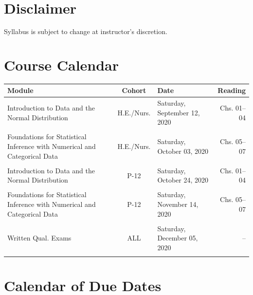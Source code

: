 \documentclass[
]{article}
\begin{document}
\section{Disclaimer}

Syllabus is subject to change at instructor's discretion.

\newpage

\section{Course Calendar}

\begin{tabularx}{\linewidth}{XcXr}
\hline
\textbf{Module} & \textbf{Cohort} & \textbf{Date} & \textbf{Reading} \\
\hline

Introduction to Data and the Normal Distribution & H.E./Nurs. & Saturday, September 12, 2020 & Chs. 01--04 \\
 &  &  &  \\
 
Foundations for Statistical Inference with Numerical and Categorical Data & H.E./Nurs. & Saturday, October 03, 2020 & Chs. 05--07 \\
 &  &  & \\
 
Introduction to Data and the Normal Distribution & P-12 & Saturday, October 24, 2020 & Chs. 01--04 \\
 &  &  & \\
 
Foundations for Statistical Inference with Numerical and Categorical Data & P-12 & Saturday, November 14, 2020 & Chs. 05--07 \\
 &  &  &  \\
 
Written Qual. Exams & ALL & Saturday, December 05, 2020 & -- \\
 &  &  &  \\
\hline
\end{tabularx}

\newpage
\section{Calendar of Due Dates}
\end{document}
